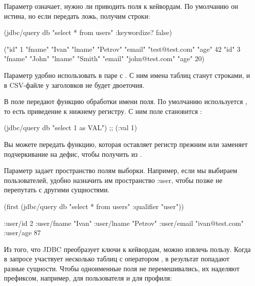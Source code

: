 Параметр  означает, нужно ли приводить поля к кейвордам. По умолчанию он истина, но если передать ложь, получим строки:

\begin{english}
  \begin{clojure}
(jdbc/query db "select * from users" {:keywordize? false})

({"id" 1
  "fname" "Ivan"
  "lname" "Petrov"
  "email" "test@test.com"
  "age" 42}
 {"id" 3
  "fname" "John"
  "lname" "Smith"
  "email" "john@test.com"
  "age" 20})
  \end{clojure}
\end{english}

Параметр удобно использовать в паре с . С ним имена таблиц станут строками, и в CSV-файле у заголовков не будет двоеточия.

В поле  передают функцию обработки имени поля. По умолчанию используется , то есть приведение к нижнему регистру. С ним поле  становится :

\begin{english}
  \begin{clojure}
(jdbc/query db "select 1 as VAL")
;; ({:val 1})
  \end{clojure}
\end{english}

Вы можете передать функцию, которая оставляет регистр прежним или заменяет подчеркивание на дефис, чтобы получить  из .

Параметр  задает пространство полям выборки. Например, если мы выбираем пользователей, удобно назначить им пространство :user, чтобы позже не перепутать с другими сущностями.

\begin{english}
  \begin{clojure}
(first (jdbc/query db "select * from users" {:qualifier "user"}))

{:user/id 2
 :user/fname "Ivan"
 :user/lname "Petrov"
 :user/email "ivan@test.com"
 :user/age 87}
  \end{clojure}
\end{english}

Из того, что JDBC преобразует ключи к кейвордам, можно извлечь пользу. Когда в запросе участвует несколько таблиц с оператором , в результат попадают разные сущности. Чтобы одноименные поля не перемешивались, их наделяют префиксом, например,  для пользователя и  для профиля:

